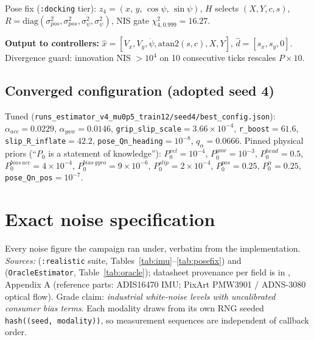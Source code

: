 \documentclass[11pt]{article}
\begin{document}
Pose fix (\texttt{:docking} tier): $z_4=(x,\,y,\,\cos\psi,\,\sin\psi)$, $H$ selects
$(X,Y,c,s)$, $R=\mathrm{diag}(\sigma_{pos}^2,\sigma_{pos}^2,\sigma_{\psi}^2,\sigma_{\psi}^2)$,
NIS gate $\chi^2_{4,0.999}=16.27$.

\textbf{Output to controllers:} $\hat x=[V_x,V_y,\dot\psi,\mathrm{atan2}(s,c),X,Y]$,
$\hat d=[s_x,s_y,0]$. Divergence guard: innovation NIS $>10^4$ on 10 consecutive ticks
rescales $P\times10$.

\subsection{Converged configuration (adopted seed 4)}
Tuned (\texttt{runs\_estimator\_v4\_mu0p5\_train12/seed4/best\_config.json}):
$\alpha_{acc}=0.0229$, $\alpha_{yaw}=0.0146$,
\texttt{grip\_slip\_scale}$=3.66\!\times\!10^{-4}$, \texttt{r\_boost}$=61.6$,
\texttt{slip\_R\_inflate}$=42.2$, \texttt{pose\_Qn\_heading}$=10^{-8}$,
$q_\alpha=0.0666$.
Pinned physical priors (``$P_0$ is a statement of knowledge''):
$P_0^{vel}=10^{-4}$, $P_0^{yaw}=10^{-3}$, $P_0^{head}=0.5$,
$P_0^{bias\,acc}=4\!\times\!10^{-4}$, $P_0^{bias\,gyro}=9\!\times\!10^{-6}$,
$P_0^{slip}=2\!\times\!10^{-4}$, $P_0^{pos}=0.25$, $P_0^{\alpha}=0.25$,
\texttt{pose\_Qn\_pos}$=10^{-7}$.

\section{Exact noise specification}
\label{app:noise}

Every noise figure the campaign ran under, verbatim from the implementation.
\emph{Sources:}  (\texttt{:realistic} suite,
Tables~\ref{tab:imu}--\ref{tab:posefix}) and 
(\texttt{OracleEstimator}, Table~\ref{tab:oracle}); datasheet provenance per field is in
, Appendix A
(reference parts: ADIS16470 IMU; PixArt PMW3901 / ADNS-3080 optical flow). Grade claim:
\emph{industrial white-noise levels with uncalibrated consumer bias terms}. Each
modality draws from its own RNG seeded \texttt{hash((seed,\,modality))}, so measurement
sequences are independent of callback order.
\end{document}
